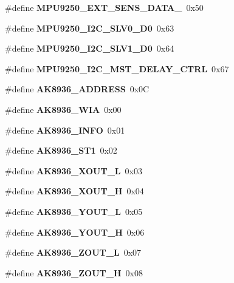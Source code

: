 \begin{DoxyCompactItemize}
\mbox{\label{_i_m_u__functions_8h_a971c0b1d68d1a29a0508d50cfbf1e228}} 
\#define {\bfseries M\+P\+U9250\+\_\+\+E\+X\+T\+\_\+\+S\+E\+N\+S\+\_\+\+D\+A\+T\+A\+\_}~0x50
\item 
\mbox{\label{_i_m_u__functions_8h_a42180ecf00b8b7f23c4649f0c440e842}} 
\#define {\bfseries M\+P\+U9250\+\_\+\+I2\+C\+\_\+\+S\+L\+V0\+\_\+\+D0}~0x63
\item 
\mbox{\label{_i_m_u__functions_8h_a39ba244fbbbe56cce3b39bb05852aa6a}} 
\#define {\bfseries M\+P\+U9250\+\_\+\+I2\+C\+\_\+\+S\+L\+V1\+\_\+\+D0}~0x64
\item 
\mbox{\label{_i_m_u__functions_8h_a3dd3301a852bb70ba5038cf0cb75f9d5}} 
\#define {\bfseries M\+P\+U9250\+\_\+\+I2\+C\+\_\+\+M\+S\+T\+\_\+\+D\+E\+L\+A\+Y\+\_\+\+C\+T\+RL}~0x67
\item 
\mbox{\label{_i_m_u__functions_8h_a7aa2f4bed039afe22d25a3c023a6e460}} 
\#define {\bfseries A\+K8936\+\_\+\+A\+D\+D\+R\+E\+SS}~0x0C
\item 
\mbox{\label{_i_m_u__functions_8h_a1af6a72066d440cb29d4ca2afecfb0c2}} 
\#define {\bfseries A\+K8936\+\_\+\+W\+IA}~0x00
\item 
\mbox{\label{_i_m_u__functions_8h_a22efa59adef08d5b45ff078de5345ccc}} 
\#define {\bfseries A\+K8936\+\_\+\+I\+N\+FO}~0x01
\item 
\mbox{\label{_i_m_u__functions_8h_ad19fd876dda2a0eeb1ca5520479e7efd}} 
\#define {\bfseries A\+K8936\+\_\+\+S\+T1}~0x02
\item 
\mbox{\label{_i_m_u__functions_8h_a5b25454e155a7df7aafffd99cd3c0211}} 
\#define {\bfseries A\+K8936\+\_\+\+X\+O\+U\+T\+\_\+L}~0x03
\item 
\mbox{\label{_i_m_u__functions_8h_a2cac47374e87bbe185a28f1bea0dae3a}} 
\#define {\bfseries A\+K8936\+\_\+\+X\+O\+U\+T\+\_\+H}~0x04
\item 
\mbox{\label{_i_m_u__functions_8h_a7ff211c31fa6aae15e88f2ea72c8d3ea}} 
\#define {\bfseries A\+K8936\+\_\+\+Y\+O\+U\+T\+\_\+L}~0x05
\item 
\mbox{\label{_i_m_u__functions_8h_a3efb2d81808967376a1d1d7f6c25ce20}} 
\#define {\bfseries A\+K8936\+\_\+\+Y\+O\+U\+T\+\_\+H}~0x06
\item 
\mbox{\label{_i_m_u__functions_8h_a1502e0eef3d2d1cd998906ee76a06fa5}} 
\#define {\bfseries A\+K8936\+\_\+\+Z\+O\+U\+T\+\_\+L}~0x07
\item 
\mbox{\label{_i_m_u__functions_8h_acd4b962d2d3f3c1f1332b5a15a125abe}} 
\#define {\bfseries A\+K8936\+\_\+\+Z\+O\+U\+T\+\_\+H}~0x08
\item 
\mbox{\label{_i_m_u__functions_8h_ae0d01282627caf476b4c4b7b7c31d9a0}} 

\end{DoxyCompactItemize}
